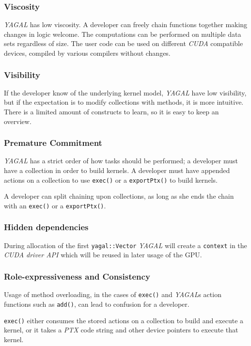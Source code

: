 \subsubsection[*]{Viscosity}
\textit{YAGAL} has low viscosity. A developer can freely chain functions together making changes in logic welcome. The computations can be performed on multiple data sets regardless of size. The user code can be used on different \textit{CUDA} compatible devices, compiled by various compilers without changes.

\subsubsection[*]{Visibility}
If the developer know of the underlying kernel model, \textit{YAGAL} have low visibility, but if the expectation is to modify collections with methods, it is more intuitive. There is a limited amount of constructs to learn, so it is easy to keep an overview.

\subsubsection[*]{Premature Commitment}
\textit{YAGAL} has a strict order of how tasks should be performed; a developer must have a collection in order to build kernels. A developer must have appended actions on a collection to use \texttt{exec()} or a \texttt{exportPtx()} to build kernels. 

A developer can split chaining upon collections, as long as she ends the chain with an \texttt{exec()} or a \texttt{exportPtx()}.

\subsubsection[*]{Hidden dependencies}
During allocation of the first \texttt{yagal::Vector} \textit{YAGAL} will create a \texttt{context} in the \textit{CUDA driver API} which will be reused in later usage of the GPU. 

\subsubsection[*]{Role-expressiveness and Consistency}
Usage of method overloading, in the cases of \texttt{exec()} and \textit{YAGAL}s action functions such as \texttt{add()}, can lead to confusion for a developer. 

\texttt{exec()} either consumes the stored actions on a collection to build and execute a kernel, or it takes a \textit{PTX} code string and other device pointers to execute that kernel.

